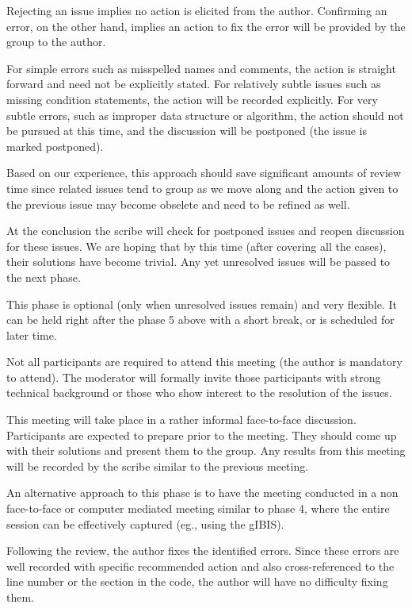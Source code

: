 Rejecting an issue implies no action is elicited from the author.
Confirming an error, on the other hand, implies an action to fix
the error will be provided by the group to the author.

For simple errors such as misspelled names and comments, the action
is straight forward and need not be explicitly stated.
For relatively subtle issues such as missing condition statements,
the action will be recorded explicitly.
For very subtle errors, such as improper data structure or algorithm,
the action should not be pursued at this time, and the discussion will 
be postponed (the issue is marked postponed).

Based on our experience,
this approach should save  significant amounts of review time
since related issues tend to group  as we move along and the
action given to the previous issue may become obselete and
need to be refined as well.

At the conclusion the scribe will check for postponed issues
and reopen discussion for these issues.  We are hoping
that by this time (after covering all the cases), their solutions
have become trivial.
Any yet unresolved issues  will be passed to the next phase.



This phase is optional (only when unresolved issues remain)
and very flexible. It can be held right
after the phase 5 above with a short break, or 
is scheduled for later time.

Not all participants
are required to attend this meeting (the author is mandatory to
attend). The moderator will formally
invite those participants with strong technical background or 
those who show interest to the resolution of the issues.

This meeting will take place in a rather informal 
face-to-face discussion.  
Participants are expected to prepare prior to the meeting.  They should 
come up with their solutions and present them  to the group.  
Any results from this meeting will be recorded by the scribe
similar to the previous meeting.

An alternative approach to this phase is 
to have the meeting conducted in a non
face-to-face or computer mediated meeting similar to phase 4,
where the entire session
can be effectively captured (eg., using the gIBIS).



Following the review, the author fixes the identified errors.
Since these errors are well recorded with specific recommended
action and also cross-referenced to
the line number or the section in the code, the author will
have no difficulty fixing them.


